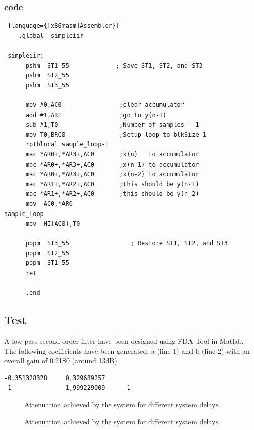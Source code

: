 \subsubsection{code}
\begin{lstlisting} [language={[x86masm]Assembler}]
	.global _simpleiir
       
_simpleiir:
      pshm  ST1_55             ; Save ST1, ST2, and ST3
      pshm  ST2_55
      pshm  ST3_55
      
      mov #0,AC0				;clear accumulator
      add #1,AR1				;go to y(n-1) 
      sub #1,T0                 ;Number of samples - 1
      mov T0,BRC0            	;Setup loop to blkSize-1
      rptblocal sample_loop-1
      mac *AR0+,*AR3+,AC0 		;x(n) 	to accumulator
      mac *AR0+,*AR3+,AC0 		;x(n-1) to accumulator
      mac *AR0+,*AR3+,AC0 		;x(n-2) to accumulator
      mac *AR1+,*AR2+,AC0 		;this should be y(n-1)    
      mac *AR1+,*AR2+,AC0 		;this should be y(n-2)   
      mov  AC0,*AR0 
sample_loop
      mov  HI(AC0),T0
                   
      popm  ST3_55                 ; Restore ST1, ST2, and ST3
      popm  ST2_55
      popm  ST1_55
      ret
	
      .end
\end{lstlisting}

\subsection{Test}
A low pass second order filter have been designed using FDA Tool in Matlab. The following coefficients have been generated: a (line 1) and b (line 2) with an overall gain of 0.2180 (around 13dB)
\begin{lstlisting}
-0,351328328	 0,329689257	
 1				 1,999229009	  1
\end{lstlisting}


\begin{figure}[H]
	\centering
	
	\caption{Attenuation achieved by the system for different system delays.}
	\label{Fig:FrequencyResponseDesignIIR}
\end{figure}

\begin{figure}[H]
	\centering
	
	\caption{Attenuation achieved by the system for different system delays.}
	\label{Fig:FrequencyResponseIIR}
\end{figure}
